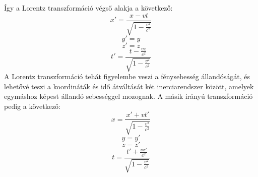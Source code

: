 \documentclass[../main.tex]{subfiles}
\begin{document}
Így a Lorentz transzformáció végső alakja a következő:
\begin{equation}
    x' = \frac{x - vt}{\sqrt{1 - \frac{v^2}{c^2}}}
\end{equation}
\begin{equation}
    y' = y
\end{equation}
\begin{equation}
    z' = z
\end{equation}
\begin{equation}
    t' = \frac{t - \frac{vx}{c^2}}{\sqrt{1 - \frac{v^2}{c^2}}}
\end{equation}
A Lorentz transzformáció tehát figyelembe veszi a fénysebesség állandóságát, és lehetővé teszi a koordináták és idő átváltását két inerciarendszer között, amelyek egymáshoz képest állandó sebességgel mozognak.
A másik irányú transzformáció pedig a következő:
\begin{equation}
    x = \frac{x' + vt'}{\sqrt{1 - \frac{v^2}{c^2}}}
\end{equation}
\begin{equation}
    y = y'
\end{equation}
\begin{equation}
    z = z'
\end{equation}
\begin{equation}
    t = \frac{t' + \frac{vx'}{c^2}}{\sqrt{1 - \frac{v^2}{c^2}}}
\end{equation}
\end{document}
